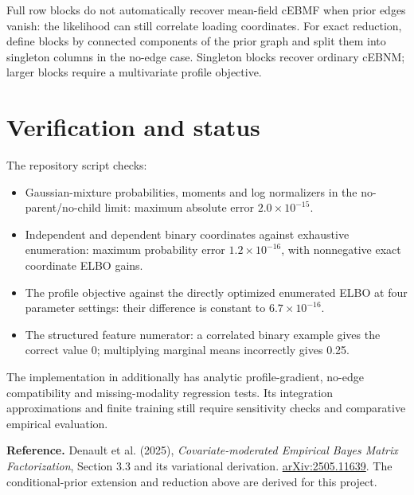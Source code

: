 \documentclass[11pt,a4paper]{article}
\begin{document}
Full row blocks do not automatically recover mean-field cEBMF when prior
edges vanish: the likelihood can still correlate loading coordinates.
For exact reduction, define blocks by connected components of the prior
graph and split them into singleton columns in the no-edge case.
Singleton blocks recover ordinary cEBNM; larger blocks require a
multivariate profile objective.

\section{Verification and status}
The repository script
 checks:
\begin{itemize}
\item Gaussian-mixture probabilities, moments and log normalizers in the
no-parent/no-child limit: maximum absolute error \(2.0\times10^{-15}\).
\item Independent and dependent binary coordinates against exhaustive
enumeration: maximum probability error \(1.2\times10^{-16}\), with
nonnegative exact coordinate ELBO gains.
\item The profile objective against the directly optimized enumerated ELBO
at four parameter settings: their difference is constant to
\(6.7\times10^{-16}\).
\item The structured feature numerator: a correlated binary example gives
the correct value 0; multiplying marginal means incorrectly gives 0.25.
\end{itemize}
The implementation in  additionally has analytic
profile-gradient, no-edge compatibility and missing-modality regression tests.
Its integration approximations and finite training still require sensitivity
checks and comparative empirical evaluation.



\vspace{3pt}
\textbf{Reference.} Denault et al. (2025),
\emph{Covariate-moderated Empirical Bayes Matrix Factorization},
Section 3.3 and its variational derivation.
\href{https://arxiv.org/abs/2505.11639}{arXiv:2505.11639}.
The conditional-prior extension and reduction above are derived for this project.
\end{document}
